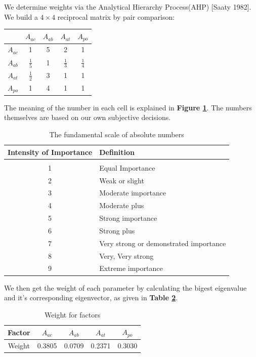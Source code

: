 \documentclass[12pt,a4paper,titlepage]{article}
\begin{document}
We determine weights via the Analytical Hierarchy Process(AHP) [Saaty
1982]. We build a $4 \times 4$ reciprocal matrix by pair comparison:
\begin{center}
\begin{tabular}{|c|c|c|c|c|}
\hline
       &$A_{ac}$      &$A_{ab}$  &$A_{at}$    &$A_{po}$  \\ \hline
 $A_{ac}$ & 1           & 5 & 2            &1            \\ \hline
 $A_{ab}$ &$\frac{1}{5}$ & 1 &$\frac{1}{3}$ & $\frac{1}{4}$\\ \hline
 $A_{at}$ &$\frac{1}{2}$ & 3 & 1            &1            \\ \hline
 $A_{po}$ &1            & 4 & 1            &1            \\ \hline
\end{tabular}
\end{center}

The meaning of the number in each cell is explained in \textbf{Figure
\ref{important}}\cite{11}. The numbers themselves are based on our own
subjective decisions.

\begin{table}[htb]
  \centering
  \begin{tabular}{cl}
    \toprule[2pt]
    Intensity of Importance & Definition \\ \midrule{}
    &\\
    1 & Equal Importance \\
    2 & Weak or slight \\
    3 & Moderate importance \\
    4 & Moderate plus \\
    5 & Strong importance \\
    6 & Strong plus \\
    7 & Very strong or demonstrated importance \\
    8 & Very, Very strong \\
    9 & Extreme importance \\ \bottomrule[2pt]
  \end{tabular}
  \caption{The fundamental scale of absolute numbers}\label{important}
\end{table}

We then get the weight of each parameter by calculating the bigest
eigenvalue and it's corresponding eigenvector, as given in \textbf{Table \ref{weight}}.

\begin{table}
\begin{center}
\begin{tabular}{ccccc} \toprule[2pt]
  Factor  &$A_{ac}$    &$A_{ab}$   &$A_{at}$    &$A_{po}$\\ \midrule{}
  Weight  &0.3805  &0.0709  &0.2371  &0.3030\\ \bottomrule[2pt]
\end{tabular}
\end{center}
\caption{Weight for factors}\label{weight}
\end{table}
\end{document}
